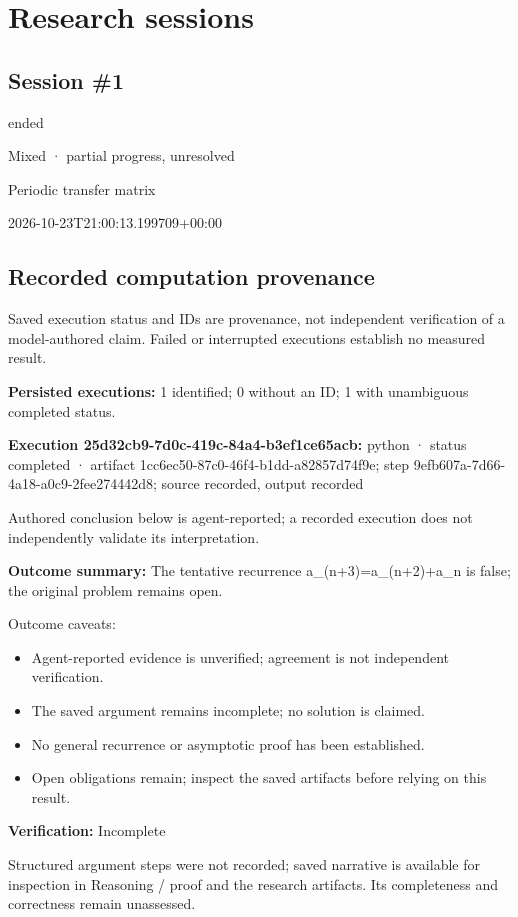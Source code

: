 \documentclass[11pt]{article}
\begin{document}
\section{Research sessions}
\subsection{Session \#1}
\begin{description}[style=nextline,font=\normalfont\bfseries,leftmargin=0pt,labelsep=0pt]
\item[Execution status] ended
\item[Outcome] Mixed · partial progress, unresolved
\item[Strategy] Periodic transfer matrix
\item[Started] 2026-10-23T21:00:13.199709+00:00
\end{description}
\subsection{Recorded computation provenance}
Saved execution status and IDs are provenance, not independent verification of a model-authored claim. Failed or interrupted executions establish no measured result.\par
\textbf{Persisted executions:} 1 identified; 0 without an ID; 1 with unambiguous completed status.\par
\textbf{Execution 25d32cb9-7d0c-419c-84a4-b3ef1ce65acb:} python · status completed · artifact 1cc6ec50-87c0-46f4-b1dd-a82857d74f9e; step 9efb607a-7d66-4a18-a0c9-2fee274442d8; source recorded, output recorded\par
Authored conclusion below is agent-reported; a recorded execution does not independently validate its interpretation.\par
\textbf{Outcome summary:} The tentative recurrence a\_(n+3)=a\_(n+2)+a\_n is false; the original problem remains open.\par
Outcome caveats:\par
\begin{itemize}
\item Agent-reported evidence is unverified; agreement is not independent verification.
\item The saved argument remains incomplete; no solution is claimed.
\item No general recurrence or asymptotic proof has been established.
\item Open obligations remain; inspect the saved artifacts before relying on this result.
\end{itemize}
\textbf{Verification:} Incomplete\par
Structured argument steps were not recorded; saved narrative is available for inspection in Reasoning / proof and the research artifacts. Its completeness and correctness remain unassessed.\par
\end{document}

